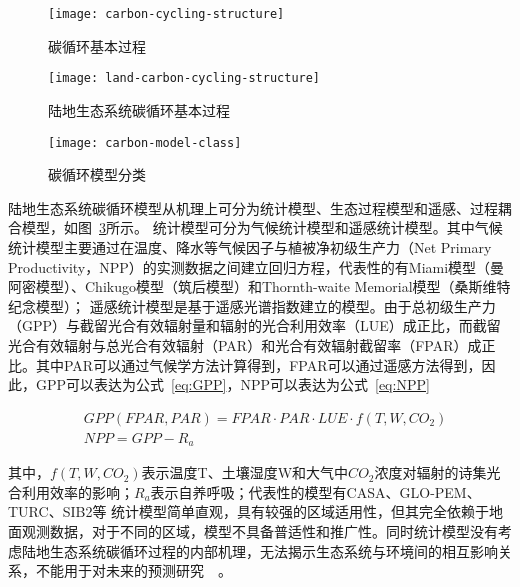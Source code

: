 \begin{figure}[!htbp]
    \centering
    \texttt{[image: carbon-cycling-structure]}
    \caption{碳循环基本过程}
    \label{fig:carbon-cycling-structure}
\end{figure}

\begin{figure}[!htbp]
    \centering
    \texttt{[image: land-carbon-cycling-structure]}
    \caption{陆地生态系统碳循环基本过程}
    \label{fig:land-carbon-cycling-structure}
\end{figure}

\begin{figure}[!htbp]
    \centering
    \texttt{[image: carbon-model-class]}
    \caption{碳循环模型分类}
    \label{fig:carbon-model-class}
\end{figure}

陆地生态系统碳循环模型从机理上可分为统计模型、生态过程模型和遥感、过程耦合模型，如图~\ref{fig:carbon-model-class}所示。
统计模型可分为气候统计模型和遥感统计模型。其中气候统计模型主要通过在温度、降水等气候因子与植被净初级生产力（Net Primary Productivity，NPP）的实测数据之间建立回归方程，代表性的有Miami模型（曼阿密模型）、Chikugo模型（筑后模型）和Thornth-waite Memorial模型（桑斯维特纪念模型）；
遥感统计模型是基于遥感光谱指数建立的模型。由于总初级生产力（GPP）与截留光合有效辐射量和辐射的光合利用效率（LUE）成正比，而截留光合有效辐射与总光合有效辐射（PAR）和光合有效辐射截留率（FPAR）成正比。其中PAR可以通过气候学方法计算得到，FPAR可以通过遥感方法得到，因此，GPP可以表达为公式~\ref{eq:GPP}，NPP可以表达为公式~\ref{eq:NPP}

\begin{align}
    &GPP(FPAR, PAR) = FPAR \cdot PAR \cdot LUE \cdot f(T, W, CO_2)
    \label{eq:GPP}  \\
    &NPP = GPP - R_a
    \label{eq:NPP}
\end{align}

其中，$f(T, W, CO_2)$表示温度T、土壤湿度W和大气中$CO_2$浓度对辐射的诗集光合利用效率的影响；$R_a$表示自养呼吸；代表性的模型有CASA、GLO-PEM、TURC、SIB2等
统计模型简单直观，具有较强的区域适用性，但其完全依赖于地面观测数据，对于不同的区域，模型不具备普适性和推广性。同时统计模型没有考虑陆地生态系统碳循环过程的内部机理，无法揭示生态系统与环境间的相互影响关系，不能用于对未来的预测研究~\cite{袁文平2014陆地生态系统植被生产力遥感模型研究进展}~\cite{谢馨瑶2018大尺度森林碳循环过程模拟模型综述}。

